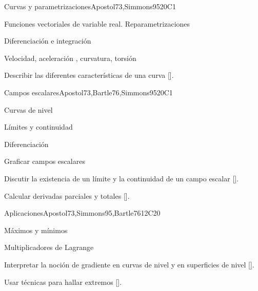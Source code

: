 \begin{syllabus}
\begin{unit}{}{Curvas y parametrizaciones}{Apostol73,Simmons95}{20}{C1}
   \begin{topics}
      \item Funciones vectoriales de variable real. Reparametrizaciones
      \item Diferenciación  e integración 
      \item Velocidad, aceleración , curvatura, torsión 
      \end{topics}
   \begin{learningoutcomes}
      \item Describir las diferentes características  de una curva [\Usage].
      \end{learningoutcomes}
\end{unit}

\begin{unit}{}{Campos escalares}{Apostol73,Bartle76,Simmons95}{20}{C1}
   \begin{topics}
      \item Curvas de nivel
      \item Límites y continuidad
      \item Diferenciación
      \end{topics}
   \begin{learningoutcomes}
      \item Graficar campos escalares
      \item Discutir la existencia de un límite y la continuidad de un campo escalar [\Usage].
      \item Calcular derivadas parciales y totales [\Usage].
      \end{learningoutcomes}
\end{unit}

\begin{unit}{}{Aplicaciones}{Apostol73,Simmons95,Bartle76}{12}{C20}
   \begin{topics}
      \item Máximos y mínimos
      \item Multiplicadores de Lagrange
      \end{topics}
   \begin{learningoutcomes}
      \item Interpretar la noción de gradiente en curvas de nivel y en superficies de nivel [\Usage].
      \item Usar técnicas para hallar extremos [\Usage].
      \end{learningoutcomes}
\end{unit}


\end{syllabus}
